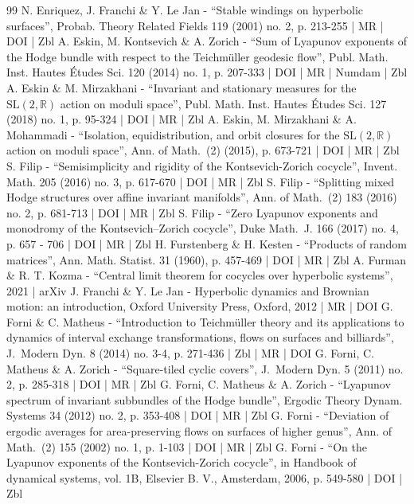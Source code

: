\begin{thebibliography}{99}
N. Enriquez, J. Franchi \& Y. Le Jan - “Stable windings on hyperbolic surfaces”, Probab. Theory Related Fields 119 (2001) no. 2, p. 213-255 | MR | DOI | Zbl
A. Eskin, M. Kontsevich \& A. Zorich - “Sum of Lyapunov exponents of the Hodge bundle with respect to the Teichmüller geodesic flow”, Publ. Math. Inst. Hautes Études Sci. 120 (2014) no. 1, p. 207-333 | DOI | MR | Numdam | Zbl
A. Eskin \& M. Mirzakhani - “Invariant and stationary measures for the $\mathrm{SL}(2,\mathbb{R})$ action on moduli space”, Publ. Math. Inst. Hautes Études Sci. 127 (2018) no. 1, p. 95-324 | DOI | MR | Zbl
A. Eskin, M. Mirzakhani \& A. Mohammadi - “Isolation, equidistribution, and orbit closures for the $\mathrm{SL}(2,\mathbb{R})$ action on moduli space”, Ann. of Math. (2) (2015), p. 673-721 | DOI | MR | Zbl
S. Filip - “Semisimplicity and rigidity of the Kontsevich-Zorich cocycle”, Invent. Math. 205 (2016) no. 3, p. 617-670 | DOI | MR | Zbl
S. Filip - “Splitting mixed Hodge structures over affine invariant manifolds”, Ann. of Math. (2) 183 (2016) no. 2, p. 681-713 | DOI | MR | Zbl
S. Filip - “Zero Lyapunov exponents and monodromy of the Kontsevich–Zorich cocycle”, Duke Math. J. 166 (2017) no. 4, p. 657 - 706 | DOI | MR | Zbl
H. Furstenberg \& H. Kesten - “Products of random matrices”, Ann. Math. Statist. 31 (1960), p. 457-469 | DOI | MR | Zbl
A. Furman \& R. T. Kozma - “Central limit theorem for cocycles over hyperbolic systems”, 2021 | arXiv
J. Franchi \& Y. Le Jan - Hyperbolic dynamics and Brownian motion: an introduction, Oxford University Press, Oxford, 2012 | MR | DOI
G. Forni \& C. Matheus - “Introduction to Teichmüller theory and its applications to dynamics of interval exchange transformations, flows on surfaces and billiards”, J. Modern Dyn. 8 (2014) no. 3-4, p. 271-436 | Zbl | MR | DOI
G. Forni, C. Matheus \& A. Zorich - “Square-tiled cyclic covers”, J. Modern Dyn. 5 (2011) no. 2, p. 285-318 | DOI | MR | Zbl
G. Forni, C. Matheus \& A. Zorich - “Lyapunov spectrum of invariant subbundles of the Hodge bundle”, Ergodic Theory Dynam. Systems 34 (2012) no. 2, p. 353-408 | DOI | MR | Zbl
G. Forni - “Deviation of ergodic averages for area-preserving flows on surfaces of higher genus”, Ann. of Math. (2) 155 (2002) no. 1, p. 1-103 | DOI | MR | Zbl
G. Forni - “On the Lyapunov exponents of the Kontsevich-Zorich cocycle”, in Handbook of dynamical systems, vol. 1B, Elsevier B. V., Amsterdam, 2006, p. 549-580 | DOI | Zbl

\end{thebibliography}
